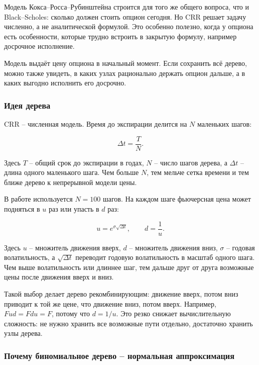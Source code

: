 \documentclass[11pt,a4paper]{article}
\begin{document}
Модель Кокса--Росса--Рубинштейна строится для того же общего вопроса, что и Black--Scholes: сколько должен стоить опцион сегодня. Но CRR решает задачу численно, а не аналитической формулой. Это особенно полезно, когда у опциона есть особенности, которые трудно встроить в закрытую формулу, например досрочное исполнение.

Модель выдаёт цену опциона в начальный момент. Если сохранить всё дерево, можно также увидеть, в каких узлах рационально держать опцион дальше, а в каких выгодно исполнить его досрочно.

\subsubsection{Идея дерева}

CRR -- численная модель. Время до экспирации делится на $N$ маленьких шагов:

\begin{equation}
\Delta t = \frac{T}{N}.
\end{equation}

Здесь $T$ -- общий срок до экспирации в годах, $N$ -- число шагов дерева, а $\Delta t$ -- длина одного маленького шага. Чем больше $N$, тем мельче сетка времени и тем ближе дерево к непрерывной модели цены.

В работе используется $N=100$ шагов. На каждом шаге фьючерсная цена может подняться в $u$ раз или упасть в $d$ раз:

\begin{equation}
u = e^{\sigma\sqrt{\Delta t}},
\qquad
d = \frac{1}{u}.
\end{equation}

Здесь $u$ -- множитель движения вверх, $d$ -- множитель движения вниз, $\sigma$ -- годовая волатильность, а $\sqrt{\Delta t}$ переводит годовую волатильность в масштаб одного шага. Чем выше волатильность или длиннее шаг, тем дальше друг от друга возможные цены после движения вверх и вниз.

Такой выбор делает дерево рекомбинирующим: движение вверх, потом вниз приводит к той же цене, что движение вниз, потом вверх. Например, $Fud=Fdu=F$, потому что $d=1/u$. Это резко снижает вычислительную сложность: не нужно хранить все возможные пути отдельно, достаточно хранить узлы дерева.

\subsubsection{Почему биномиальное дерево -- нормальная аппроксимация}
\end{document}
